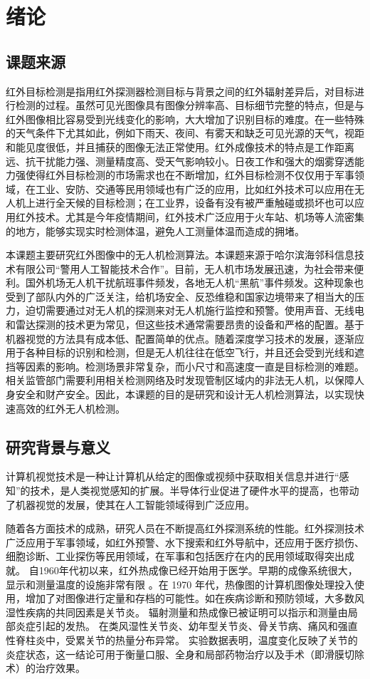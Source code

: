 \chapter{绪论}

\section{课题来源}
红外目标检测是指用红外探测器检测目标与背景之间的红外辐射差异后，对目标进行检测的过程。虽然可见光图像具有图像分辨率高、目标细节完整的特点，但是与红外图像相比容易受到光线变化的影响，大大增加了识别目标的难度。在一些特殊的天气条件下尤其如此，例如下雨天、夜间、有雾天和缺乏可见光源的天气，视距和能见度很低，并且捕获的图像无法正常使用。红外成像技术的特点是工作距离远、抗干扰能力强、测量精度高、受天气影响较小。日夜工作和强大的烟雾穿透能力强使得红外目标检测的市场需求也在不断增加，红外目标检测不仅仅用于军事领域，在工业、安防、交通等民用领域也有广泛的应用，比如红外技术可以应用在无人机上进行全天候的目标检测；在工业界，设备有没有被严重触碰或损坏也可以应用红外技术。尤其是今年疫情期间，红外技术广泛应用于火车站、机场等人流密集的地方，能够实现实时检测体温，避免人工测量体温而造成的拥堵。

本课题主要研究红外图像中的无人机检测算法。本课题来源于哈尔滨海邻科信息技术有限公司“警用人工智能技术合作”。目前，无人机市场发展迅速，为社会带来便利。国外机场无人机干扰航班事件频发，各地无人机“黑航”事件频发。这种现象也受到了部队内外的广泛关注，给机场安全、反恐维稳和国家边境带来了相当大的压力，迫切需要通过对无人机的探测来对无人机施行监控和预警。使用声音、无线电和雷达探测的技术更为常见，但这些技术通常需要昂贵的设备和严格的配置。基于机器视觉的方法具有成本低、配置简单的优点。随着深度学习技术的发展，逐渐应用于各种目标的识别和检测，但是无人机往往在低空飞行，并且还会受到光线和遮挡等因素的影响。检测场景非常复杂，而小尺寸和高速度一直是目标检测的难题。相关监管部门需要利用相关检测网络及时发现管制区域内的非法无人机，以保障人身安全和财产安全。因此，本课题的目的是研究和设计无人机检测算法，以实现快速高效的红外无人机检测。

\section{研究背景与意义}
计算机视觉技术是一种让计算机从给定的图像或视频中获取相关信息并进行“感知”的技术，是人类视觉感知的扩展。半导体行业促进了硬件水平的提高，也带动了机器视觉的发展，使其在人工智能领域得到广泛应用。

随着各方面技术的成熟，研究人员在不断提高红外探测系统的性能。红外探测技术广泛应用于军事领域，如红外预警、水下搜索和红外导航中，还应用于医疗损伤、细胞诊断、工业探伤等民用领域，在军事和包括医疗在内的民用领域取得突出成就。
自1960年代初以来，红外热成像已经开始用于医学\cite{ring1975thermography}。早期的成像系统很大，显示和测量温度的设施非常有限
。在 1970 年代，热像图的计算机图像处理投入使用，增加了对图像进行定量和存档的可能性。如在疾病诊断和预防领域，大多数风湿性疾病的共同因素是关节炎。 辐射测量和热成像已被证明可以指示和测量由局部炎症引起的发热。 在类风湿性关节炎、幼年型关节炎、骨关节病、痛风和强直性脊柱炎中，受累关节的热量分布异常。 实验数据表明，温度变化反映了关节的炎症状态，这一结论可用于衡量口服、全身和局部药物治疗以及手术（即滑膜切除术）的治疗效果。

